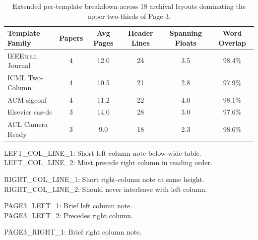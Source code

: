 \documentclass[10pt,twocolumn]{article}
\begin{document}
\newpage
\begin{table}[t]
\centering
\caption{Extended per-template breakdown across 18 archival layouts dominating the upper two-thirds of Page 3.}
\vspace{4pt}
\begin{tabular}{lccccc}
\hline
Template Family & Papers & Avg Pages & Header Lines & Spanning Floats & Word Overlap \\
\hline
IEEEtran Journal & 4 & 12.0 & 24 & 3.5 & 98.4\% \\
ICML Two-Column & 4 & 10.5 & 21 & 2.8 & 97.9\% \\
ACM sigconf & 4 & 11.2 & 22 & 4.0 & 98.1\% \\
Elsevier cas-dc & 3 & 14.0 & 28 & 3.0 & 97.6\% \\
ACL Camera Ready & 3 & 9.0 & 18 & 2.3 & 98.6\% \\
\hline
\end{tabular}
\end{table}
\noindent LEFT\_COL\_LINE\_1: Short left-column note below wide table.\\
LEFT\_COL\_LINE\_2: Must precede right column in reading order.

\newpage
\noindent RIGHT\_COL\_LINE\_1: Short right-column note at same height.\\
RIGHT\_COL\_LINE\_2: Should never interleave with left column.

\newpage
\noindent PAGE3\_LEFT\_1: Brief left column note.\\
PAGE3\_LEFT\_2: Precedes right column.

\newpage
\noindent PAGE3\_RIGHT\_1: Brief right column note.
\end{document}
